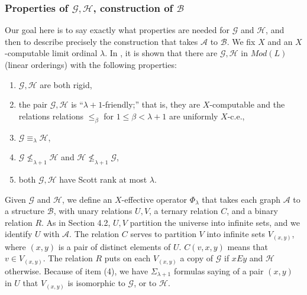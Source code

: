 \documentclass{article}
\begin{document}
\subsubsection{Properties of $\mathcal{G},\mathcal{H}$, construction of $\mathcal{B}$}

Our goal here is to say exactly what properties are needed for $\mathcal{G}$ and $\mathcal{H}$, and then to describe precisely the construction that takes $\mathcal{A}$ to $\mathcal{B}$.  We fix $X$ and an $X$-computable limit ordinal $\lambda$.  In \cite{GHKMMS}, it is shown that there are $\mathcal{G},\mathcal{H}$ in $Mod(L)$ (linear orderings) with the following properties:

\begin{enumerate}

\item  $\mathcal{G},\mathcal{H}$ are both rigid,   

\item  the pair $\mathcal{G},\mathcal{H}$ is ``$\lambda+1$-friendly;'' that is, they are $X$-computable and the relations relations $\leq_\beta$ for $1\leq\beta < \lambda+1$ are uniformly $X$-c.e.,

\item  $\mathcal{G}\equiv_\lambda\mathcal{H}$, 

\item  $\mathcal{G}\not\leq_{\lambda+1}\mathcal{H}$ and $\mathcal{H}\not\leq_{\lambda+1}\mathcal{G}$, 

\item  both $\mathcal{G},\mathcal{H}$ have Scott rank at most $\lambda$.

\end{enumerate}

Given $\mathcal{G}$ and $\mathcal{H}$, we define an $X$-effective operator $\Phi_\lambda$ that takes each graph $\mathcal{A}$ to a structure $\mathcal{B}$, with unary relations $U,V$, a ternary relation $C$, and a binary relation $R$.  As in Section 4.2, $U,V$ partition the universe into infinite sets, and we identify $U$ with $\mathcal{A}$.  The relation $C$ serves to partition $V$ into infinite sets $V_{(x,y)}$, where $(x,y)$ is a pair of distinct elements of $U$. $C(v,x,y)$ means that $v\in V_{(x,y)}$.  The relation $R$ puts on each $V_{(x,y)}$ a copy of $\mathcal{G}$ if $xEy$ and $\mathcal{H}$ otherwise.  Because of item (4), we have $\Sigma_{\lambda+1}$ formulas saying of a pair $(x,y)$ in $U$ that $V_{(x,y)}$ is isomorphic to $\mathcal{G}$, or to $\mathcal{H}$.   
\end{document}
